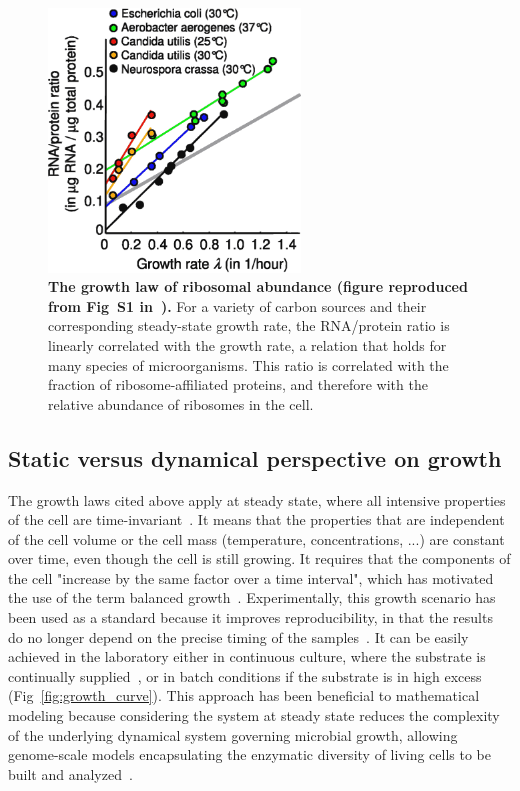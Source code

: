 \begin{figure}[tb]
\centering
\includegraphics[height=7cm]{./Fig/Chapter1/scott_rnaprot}
\caption{
\textbf{The growth law of ribosomal abundance (figure reproduced from Fig~S1 in~\cite{scott_interdependence_2010}).}
For a variety of carbon sources and their corresponding steady-state growth rate, the RNA/protein ratio is linearly correlated with the growth rate, a relation that holds for many species of microorganisms.
This ratio is correlated with the fraction of ribosome-affiliated proteins, and therefore with the relative abundance of ribosomes in the cell.
}
\label{fig:scott_rnaprot}
\end{figure}

\subsection{Static versus dynamical perspective on growth}

The growth laws cited above apply at steady state, where all intensive properties of the cell are time-invariant~\cite{schaechter_microbe_2006,fishov_microbial_1995}.
It means that the properties that are independent of the cell volume or the cell mass (temperature, concentrations, ...) are constant over time, even though the cell is still growing.
It requires that the components of the cell "increase by the same factor over a time interval", which has motivated the use of the term balanced growth~\cite{campbell_synchronization_1957}.
Experimentally, this growth scenario has been used as a standard because it improves reproducibility, in that the results do no longer depend on the precise timing of the samples~\cite{schaechter_microbe_2006}.
It can be easily achieved in the laboratory either in continuous culture, where the substrate is continually supplied~\cite{borirak_molecular_2014}, or in batch conditions if the substrate is in high excess (Fig~\ref{fig:growth_curve}).
This approach has been beneficial to mathematical modeling because considering the system at steady state reduces the complexity of the underlying dynamical system governing microbial growth, allowing genome-scale models encapsulating the enzymatic diversity of living cells to be built and analyzed~\cite{orth_what_2010}.

